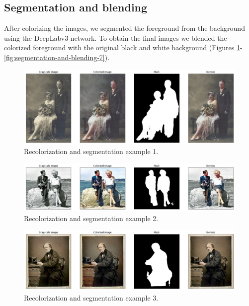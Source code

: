 \documentclass[
]{article}
\begin{document}
\hypertarget{segmentation-and-blending}{%
\subsection{Segmentation and blending}\label{segmentation-and-blending}}

After colorizing the images, we segmented the foreground from the
background using the DeepLabv3 network. To obtain the final images we
blended the colorized foreground with the original black and white
background (Figures \ref{fig:segmentation-and-blending-1}-\ref{fig:segmentation-and-blending-7}).

\begin{figure}
\centering
\includegraphics{report_images/segment-blend-result-7.png}
\caption{Recolorization and segmentation example 1.}
\label{fig:segmentation-and-blending-1}
\end{figure}

\begin{figure}
\centering
\includegraphics{report_images/segment-blend-result-6.png}
\caption{Recolorization and segmentation example 2.}
\label{fig:segmentation-and-blending-2}
\end{figure}

\begin{figure}
\centering
\includegraphics{report_images/segment-blend-result-5.png}
\caption{Recolorization and segmentation example 3.}
\label{fig:segmentation-and-blending-3}
\end{figure}
\end{document}

